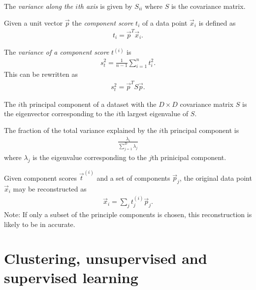 \documentclass{article}
\begin{document}
\begin{definition}
	The \emph{variance along the $i$th axis} is given by $S_{ii}$ where $S$ is the
	covariance matrix.
\end{definition}
\begin{definition}
	Given a unit vector $\vec p$ the \emph{component score} $t_i$ of a data point
	$\vec x_i$ is defined as
	\begin{align*}
		t_i = {\vec p}^{T} \vec x_i.
	\end{align*}
\end{definition}
\begin{definition}
	The \emph{variance of a component score} $t^{(i)}$ is
	\begin{align*}
		s_t^2 = \frac{1}{n-1}\sum_{i=1}^n t_i^2.
	\end{align*}
	This can be rewritten as
	\begin{align*}
		s^2_t = \vec p^T S\vec p.
	\end{align*}
\end{definition}
\begin{theorem}
	The $i$th principal component of a dataset with the $D\times D$ covariance
	matrix $S$ is the eigenvector corresponding to the $i$th largest eigenvalue 
	of $S$.
\end{theorem}
\begin{proposition}
	The fraction of the total variance explained by the $i$th principal component
	is 
	\begin{align*}
		\frac{\lambda_i}{\sum_{j=1}^D \lambda_j}
	\end{align*}
	where $\lambda_j$ is the eigenvalue corresponding to the $j$th prinicipal
	component.
\end{proposition}

\begin{theorem}
	Given component scores $\vec t^{(i)}$ and a set of components $\vec p_j$,
	the original data point $\vec x_i$ may be reconstructed as
	\begin{align*}
		\vec x_i = \sum_j t^{(i)}_j \vec p_j.
	\end{align*}
	Note: If only a subset of the principle components is chosen, this
	reconstruction is likely to be in accurate.
\end{theorem}


\section{Clustering, unsupervised and supervised learning}
\end{document}
